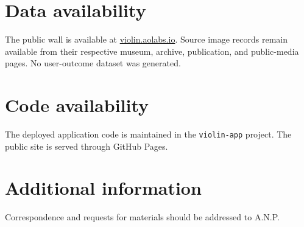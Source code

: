 \documentclass[12pt,letterpaper]{article}
\begin{document}
\section*{Data availability}
The public wall is available at \href{https://violin.aolabs.io/}{violin.aolabs.io}. Source image records remain available from their respective museum, archive, publication, and public-media pages. No user-outcome dataset was generated.

\section*{Code availability}
The deployed application code is maintained in the \texttt{violin-app} project. The public site is served through GitHub Pages.

\section*{Additional information}
Correspondence and requests for materials should be addressed to A.N.P.

\FloatBarrier
\printbibliography[title={References}]
\end{document}
